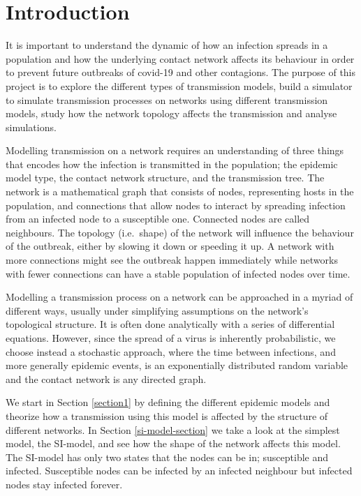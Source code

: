 \documentclass[12pt]{article} %
\numberwithin{equation}{section}
\begin{document}
\newpage
\thispagestyle{empty}
\tableofcontents %


\newpage
\setcounter{page}{1}
\section{Introduction}
It is important to understand the dynamic of how an infection spreads in a population and how the underlying contact network affects its behaviour in order to prevent future outbreaks of covid-19 and other contagions. The purpose of this project is to explore the different types of transmission models, build a simulator to simulate transmission processes on networks using different transmission models, study how the network topology affects the transmission and analyse simulations.

Modelling transmission on a network requires an understanding of three things that encodes how the infection is transmitted in the population; the epidemic model type, the contact network structure, and the transmission tree. The network is a mathematical graph that consists of nodes, representing hosts in the population, and connections that allow nodes to interact by spreading infection from an infected node to a susceptible one. Connected nodes are called neighbours. The topology (i.e.~shape) of the network will influence the behaviour of the outbreak, either by slowing it down or speeding it up. A network with more connections might see the outbreak happen immediately while networks with fewer connections can have a stable population of infected nodes over time.

Modelling a transmission process on a network can be approached in a myriad of different ways, usually under simplifying assumptions on the network's topological structure. It is often done analytically with a series of differential equations. However, since the spread of a virus is inherently probabilistic, we choose instead a stochastic approach, where the time between infections, and more generally epidemic events, is an exponentially distributed random variable and the contact network is any directed graph. 

We start in Section \ref{section1} by defining the different epidemic models and theorize how a transmission using this model is affected by the structure of different networks. In Section \ref{si-model-section} we take a look at the simplest model, the SI-model, and see how the shape of the network affects this model. The SI-model has only two states that the nodes can be in; susceptible and infected. Susceptible nodes can be infected by an infected neighbour but infected nodes stay infected forever.
\end{document}
